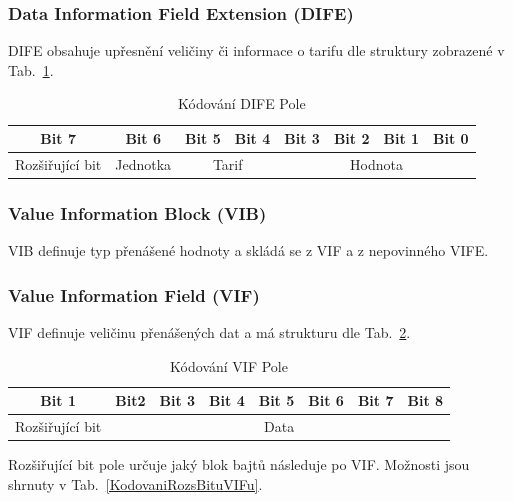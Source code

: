 \subsubsection{Data Information Field Extension (DIFE)}
DIFE obsahuje upřesnění veličiny či informace o tarifu dle struktury zobrazené v Tab.~\ref{KodovaniDIFE}.

\begin{table}[!ht]
\centering
\caption{Kódování DIFE Pole}
\label{KodovaniDIFE}
\begin{tabular}{|c|c|c|c|c|c|c|c|}
\hline \hline
\textbf{Bit 7}  & \textbf{Bit 6} & \textbf{Bit 5} & \textbf{Bit 4} & \textbf{Bit 3} & \textbf{Bit 2} & \textbf{Bit 1} & \textbf{Bit 0} \\ \hline 
Rozšiřující bit & Jednotka       & \multicolumn{2}{c|}{Tarif}      & \multicolumn{4}{c|}{Hodnota}                                      \\ \hline \hline
\end{tabular}
\end{table}

\subsubsection{Value Information Block (VIB)}
VIB definuje typ přenášené hodnoty a skládá se z VIF a z nepovinného VIFE.

\subsubsection{Value Information Field (VIF)}
VIF definuje veličinu přenášených dat a má strukturu dle Tab.~\ref{KodovaniVIFu}.

\begin{table}[!ht]
\centering
\caption{Kódování VIF Pole}
\label{KodovaniVIFu}
\begin{tabular}{|c|c|c|c|c|c|c|c|}
\hline \hline
\textbf{Bit 1}  & \textbf{Bit2} & \textbf{Bit 3} & \textbf{Bit 4} & \textbf{Bit 5} & \textbf{Bit 6} & \textbf{Bit 7} & \textbf{Bit 8} \\ \hline 
Rozšiřující bit & \multicolumn{7}{c|}{Data}                                                                                           \\ \hline \hline
\end{tabular}
\end{table}

Rozšiřující bit pole určuje jaký blok bajtů následuje po VIF. Možnosti jsou shrnuty v Tab.~\ref{KodovaniRozsBituVIFu}.

